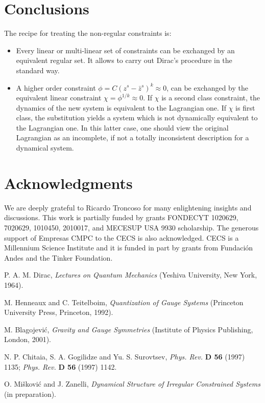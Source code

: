 \documentclass[a4paper,thmsa,11pt]{article}
\begin{document}

\section{Conclusions}

The recipe for treating the non-regular constraints is:

\begin{itemize}
\item  Every linear or multi-linear set of constraints can be exchanged by
an equivalent regular set. It allows to carry out Dirac's procedure in the
standard way.

\item  A higher order constraint $\phi =C\left( z^{s}-\bar{z}^{s}\right)
^{k}\approx 0$, can be exchanged by the equivalent linear constraint $\chi
=\phi ^{1/k}\approx 0$. If $\chi $ is a second class constraint, the
dynamics of the new system is equivalent to the Lagrangian one. If $\chi $
is first class, the substitution yields a system which is not dynamically
equivalent to the Lagrangian one. In this latter case, one should view the
original Lagrangian as an incomplete, if not a totally inconsistent
description for a dynamical system.
\end{itemize}


\section*{Acknowledgments}

We are deeply grateful to Ricardo Troncoso for many enlightening insights and discussions. This
work is partially funded by grants FONDECYT  1020629, 7020629, 1010450, 2010017, and MECESUP USA
9930 scholarship. The generous support of Empresas CMPC to the CECS is also acknowledged. CECS is
a Millennium Science Institute and it is funded in part by grants from Fundaci\'{o}n Andes and the
Tinker Foundation.


\begin{thebibliography}{9}

  P. A. M. Dirac, \emph{Lectures on Quantum Mechanics}
(Yeshiva University, New York, 1964).

  M. Henneaux and C. Teitelboim, \emph{%
Quantization of Gauge Systems} (Princeton University Press, Princeton, 1992).

  M. Blagojevi\'{c}, \emph{Gravity and Gauge Symmetries}
(Institute of Physics Publishing, London, 2001).

  N. P. Chitaia, S. A. Gogilidze and
Yu. S. Surovtsev, \emph{Phys. Rev.} \textbf{D 56} (1997) 1135; \emph{Phys.
Rev.} \textbf{D 56} (1997) 1142.

  O. Mi\v {s}kovi\'{c} and J. Zanelli, \emph{Dynamical Structure of Irregular Constrained Systems} (in preparation).
\end{thebibliography}
\end{document}
